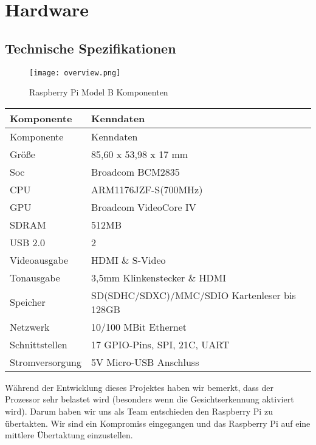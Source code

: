\section{Hardware}
\subsection{Technische Spezifikationen}

\begin{figure}[h]
  \begin{center}		%
    \texttt{[image: overview.png]}
  		  \caption{Raspberry Pi Model B Komponenten}
     \label{raspPic_Komp}
  \end{center}
\end{figure}

\begin{longtable}{||l|l||}

\hline
Komponente & Kenndaten\\ \hline\hline
\endfirsthead
\hline
Komponente & Kenndaten \\ \hline\hline
\endhead

Größe & 85,60 x 53,98 x 17 mm\\ \hline
Soc & Broadcom BCM2835\\ \hline
CPU & ARM1176JZF-S(700MHz)\\ \hline
GPU & Broadcom VideoCore IV \\ \hline
SDRAM & 512MB\\ \hline
USB 2.0 & 2\\ \hline
Videoausgabe & HDMI \& S-Video\\ \hline
Tonausgabe & 3,5mm Klinkenstecker \& HDMI\\ \hline
Speicher & SD(SDHC/SDXC)/MMC/SDIO Kartenleser bis 128GB\\ \hline
Netzwerk & 10/100 MBit Ethernet\\ \hline
Schnittstellen & 17 GPIO-Pins, SPI, 21C, UART\\ \hline
Stromversorgung & 5V Micro-USB Anschluss\\ \hline

\end{longtable}
\cite{bib.RaspPi}\cite{bib.RaspPiGuide}

Während der Entwicklung dieses Projektes haben wir bemerkt, dass der Prozessor sehr belastet wird (besonders wenn die Gesichtserkennung aktiviert wird). Darum haben wir uns als Team entschieden den Raspberry Pi zu übertakten. Wir sind ein Kompromiss eingegangen und das Raspberry Pi auf eine mittlere Übertaktung einzustellen.
\newpage

